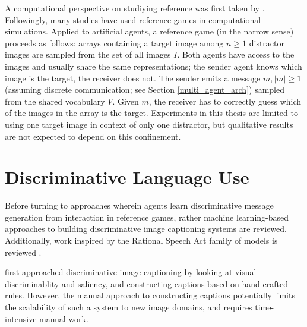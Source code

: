 A computational perspective on studiying reference was first taken by \cite{dale1995computational}. Followingly, many studies have used reference games in computational simulations. Applied to artificial agents, a reference game (in the narrow sense) proceeds as follows: arrays containing a target image among $n \geq 1$ distractor images are sampled from the set of all images $I$. Both agents have access to the images and usually share the same representations; the sender agent knows which image is the target, the receiver does not. The sender emits a message $m, |m| \geq 1$ (assuming discrete communication; see Section \ref{multi_agent_arch}) sampled from the shared vocabulary $V$. Given $m$, the receiver has to correctly guess which of the images in the array is the target. Experiments in this thesis are limited to using one target image in context of only one distractor, but qualitative results are not expected to depend on this confinement.


\section{Discriminative Language Use}
\label{discriminative_lang}

Before turning to approaches wherein agents learn discriminative message generation from interaction in reference games, rather machine learning-based approaches to building discriminative image captioning systems are reviewed. Additionally, work inspired by the Rational Speech Act family of models is reviewed \parencite{goodman2016pragmatic}.

\cite{sadovnik2012image} first approached discriminative image captioning by looking at visual discriminablity and saliency, and constructing captions based on hand-crafted rules. However, the manual approach to constructing captions potentially limits the scalability of such a system to new image domains, and requires time-intensive manual work. 


